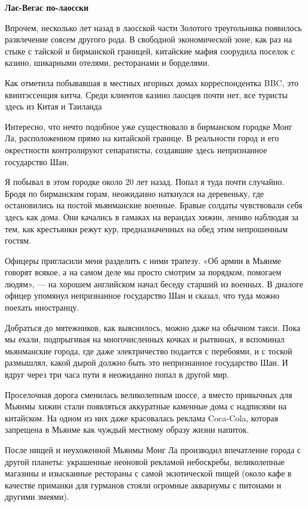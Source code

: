\textbf{Лас-Вегас по-лаосски}

Впрочем, несколько лет назад в лаосской части Золотого треугольника появилось развлечение совсем другого рода. В свободной экономической зоне, как раз на стыке с тайской и бирманской границей, китайские мафия соорудила поселок с казино, шикарными отелями, ресторанами и борделями.

\begin{fancyquotes}
    Как отметила побывавшая в местных игорных домах корреспондентка BBC, это квинтэссенция китча. Среди клиентов казино лаосцев почти нет, все туристы здесь из Китая и Таиланда
\end{fancyquotes}

Интересно, что нечто подобное уже существовало в бирманском городке Монг Ла, расположенном прямо на китайской границе. В реальности город и его окрестности контролируют сепаратисты, создавшие здесь непризнанное государство Шан.

Я побывал в этом городке около 20 лет назад. Попал я туда почти случайно. Бродя по бирманским горам, неожиданно наткнулся на деревеньку, где остановились на постой мьянманские военные. Бравые солдаты чувствовали себя здесь как дома. Они качались в гамаках на верандах хижин, лениво наблюдая за тем, как крестьянки режут кур, предназначенных на обед этим непрошенным гостям.

Офицеры пригласили меня разделить с ними трапезу. «Об армии в Мьянме говорят всякое, а на самом деле мы просто смотрим за порядком, помогаем людям», — на хорошем английском начал беседу старший из военных.
В диалоге офицер упомянул непризнанное государство Шан и сказал, что туда можно поехать иностранцу.

Добраться до мятежников, как выяснилось, можно даже на обычном такси. Пока мы ехали, подпрыгивая на многочисленных кочках и рытвинах, я вспоминал мьянманские города, где даже электричество подается с перебоями, и с тоской размышлял, какой дырой должно быть это непризнанное государство Шан. И вдруг через три часа пути я неожиданно попал в другой мир.

Проселочная дорога сменилась великолепным шоссе, а вместо привычных для Мьянмы хижин стали появляться аккуратные каменные дома с надписями на китайском. На одном из них даже красовалась реклама Coca-Cola, которая запрещена в Мьянме как чуждый местному образу жизни напиток.

После нищей и неухоженной Мьянмы Монг Ла производил впечатление города с другой планеты: украшенные неоновой рекламой небоскребы, великолепные магазины и изысканные рестораны с самой экзотической пищей (около кафе в качестве приманки для гурманов стояли огромные аквариумы с питонами и другими змеями).

